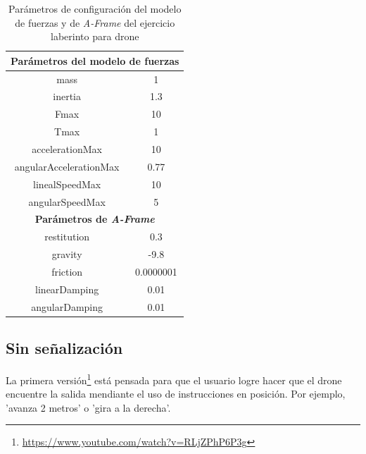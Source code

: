 \clearpage
\begin{table}[h!]
\centering
\begin{tabular}{|c|c|}
\hline
\multicolumn{2}{|c|}{\textbf{Parámetros del modelo de fuerzas}}                \\ \hline
mass                                           & 1                             \\ \hline
inertia                                        & 1.3                           \\ \hline
Fmax                                           & 10                            \\ \hline
Tmax                                           & 1                             \\ \hline
accelerationMax                                & 10                            \\ \hline
angularAccelerationMax                         & 0.77                          \\ \hline
linealSpeedMax                                 & 10                            \\ \hline
angularSpeedMax                                & 5                             \\ \hline
\multicolumn{2}{|c|}{\textbf{Parámetros de \textit{A-Frame}}} \\ \hline
restitution                                    & 0.3                           \\ \hline
gravity                                        & -9.8                          \\ \hline
friction                                       &  0.0000001                       \\ \hline
linearDamping                                  & 0.01                         \\ \hline
angularDamping                                 & 0.01                         \\ \hline
\end{tabular}
\caption{Parámetros de configuración del modelo de fuerzas y de \textit{A-Frame} del ejercicio laberinto para drone}
\label{tabla:param_ej3}
\end{table}

\subsection{Sin señalización}
La primera versión\footnote{\url{https://www.youtube.com/watch?v=RLjZPhP6P3g}} está pensada para que el usuario logre hacer que el drone encuentre la salida mendiante el uso de instrucciones en posición. Por ejemplo, 'avanza 2 metros' o 'gira a la derecha'.

